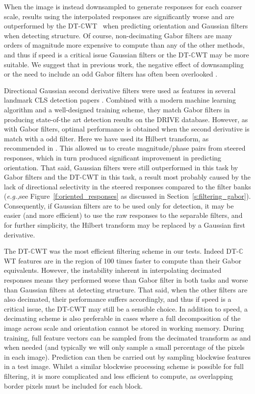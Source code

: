 \documentclass{IEEEtran}
\def\eg{\emph{e.g.,}}
\newcommand{\fref}[1]{Figure~\ref{#1}}
\newcommand{\sref}[1]{Section~\ref{#1}}
\def\dtcwt{DT-$\mathbb{C}$WT}
\begin{document}
When the image is instead downsampled to generate responses for each coarser scale, results using the interpolated responses are significantly worse and are outperformed by the \dtcwt~ when predicting orientation and Gaussian filters when detecting structure. Of course, non-decimating Gabor filters are many orders of magnitude more expensive to compute than any of the other methods, and thus if speed is a critical issue Gaussian filters or the \dtcwt{} may be more suitable. We suggest that in previous work, the negative effect of downsampling or the need to include an odd Gabor filters has often been overlooked \cite{}.

Directional Gaussian second derivative filters were used as features in several landmark CLS detection papers \cite{Frangi_etal_MICCAI98,Staal_etal_TMI04}. Combined with a modern machine learning algorithm and a well-designed training scheme, they match Gabor filters in producing state-of-the art detection results on the DRIVE database. However, as with Gabor filters, optimal performance is obtained when the second derivative is match with a odd filter. Here we have used its Hilbert transform, as recommended in \cite{Freeman_Adelson_TPAMI91}. This allowed us to create magnitude/phase pairs from steered responses, which in turn produced significant improvement in predicting orientation. That said, Gaussian filters were still outperformed in this task by Gabor filters and the \dtcwt{} in this task, a result most probably caused by the lack of directional selectivity in the steered responses compared to the filter banks (\eg see \fref{f:oriented_responses} as discussed in \sref{s:filtering_gabor}). Consequently, if Gaussian filters are to be used only for detection, it may be easier (and more efficient) to use the raw responses to the separable filters, and for further simplicity, the Hilbert transform may be replaced by a Gaussian first derivative.

The \dtcwt{} was the most efficient filtering scheme in our tests. Indeed \dtcwt{} features are in the region of 100 times faster to compute than their Gabor equivalents. However, the instability inherent in interpolating decimated responses means they performed worse than Gabor filter in both tasks and worse than Gaussian filters at detecting structure. That said, when the other filters are also decimated, their performance suffers accordingly, and thus if speed is a critical issue, the \dtcwt{} may still be a sensible choice. In addition to speed, a decimating scheme is also preferable in cases where a full decomposition of the image across scale and orientation cannot be stored in working memory. During training, full feature vectors can be sampled from the decimated transform as and when needed (and typically we will only sample a small percentage of the pixels in each image). Prediction can then be carried out by sampling blockwise features in a test image. Whilst a similar blockwise processing scheme is possible for full filtering, it is more complicated and less efficient to compute, as overlapping border pixels must be included for each block.
\end{document}

